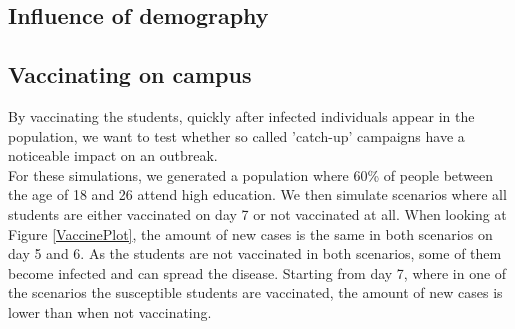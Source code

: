 \documentclass[runningheads]{llncs}
\begin{document}
\subsection{Influence of demography}

\subsection{Vaccinating on campus}
By vaccinating the students, quickly after infected individuals appear in the population, we want to test whether so called 'catch-up' campaigns have a noticeable impact on an outbreak. \\
For these simulations, we generated a population where 60\% of people between the age of 18 and 26 attend high education. We then simulate scenarios where all students are either vaccinated on day 7 or not vaccinated at all. When looking at Figure \ref{VaccinePlot}, the amount of new cases is the same in both scenarios on day 5 and 6. As the students are not vaccinated in both scenarios, some of them become infected and can spread the disease. Starting from day 7, where in one of the scenarios the susceptible students are vaccinated, the amount of new cases is lower than when not vaccinating.
\end{document}
